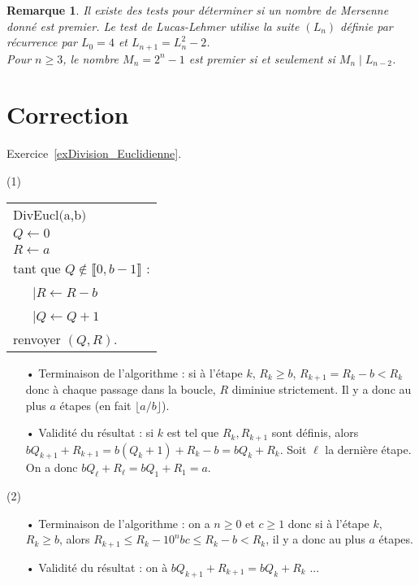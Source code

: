 \documentclass[11pt,a4paper]{article}
\newtheorem*{rem}{Remarque}
\begin{document}
\begin{rem}
Il existe des tests pour déterminer si un nombre de Mersenne donné est premier. Le test de Lucas-Lehmer utilise la suite $(L_n)$ définie par récurrence par $L_0=4$ et $L_{n+1}=L_n^2-2$.\\
Pour $n \geqslant 3$, le nombre $M_n= 2^n -1$ est premier si et seulement si $M_n \mid L_{n-2}$. 
\end{rem}


\section*{Correction}

Exercice~\ref{exDivision_Euclidienne}.

(1) \begin{center}
\begin{tabular}{l}
DivEucl$($a,b$)$\\
$ Q \leftarrow 0$ \\
$R \leftarrow a$ \\
tant que $Q \notin \llbracket 0,b-1\rrbracket$ :\\
\ \ \ {\rm  |}$R\leftarrow R-b$\\
\ \ \ {\rm  |}$Q\leftarrow Q+1$\\
renvoyer $(Q,R)$.

\end{tabular}
\end{center}

\begin{itemize}
\item[•] Terminaison de l'algorithme : si à l'étape $k$, $R_k\geq b$, $R_{k+1}=R_k-b<R_k$ donc à chaque passage dans la boucle, $R$ diminiue strictement. Il y a donc au plus $a$ étapes (en fait $\lfloor a/b\rfloor$).

\item[•] Validité du résultat : si $k$ est tel que $R_k,R_{k+1}$ sont définis, alors $b Q_{k+1} +R_{k+1}= b(Q_k+1)+R_k-b=b Q_k+R_k$. Soit $\ell$ la dernière étape. On a donc $bQ_\ell+R_\ell=b Q_1+R_1=a$.
\end{itemize}

(2) \begin{itemize}
\item[•] Terminaison de l'algorithme : on a $n\geq 0$ et $c\geq 1$ donc si à l'étape $k$, $R_k\geq b$, alors $R_{k+1}\leq R_k-10^n bc\leq R_k-b<R_k$, il y a donc au plus $a$ étapes.

\item[•] Validité du résultat : on à $bQ_{k+1}+R_{k+1}=bQ_k+R_k$ ...
\end{itemize}
\end{document}
